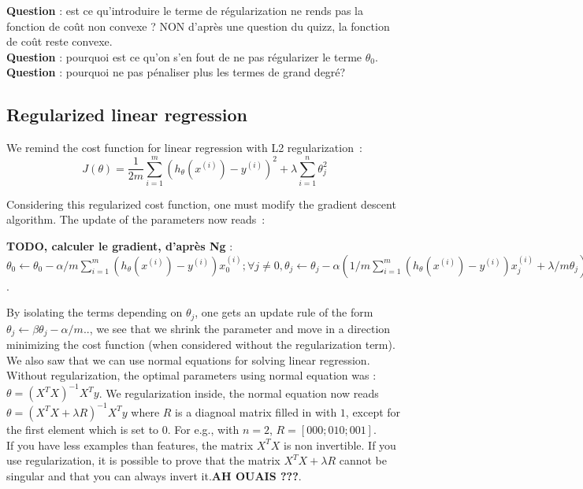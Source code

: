 \documentclass[10pt,a4paper]{article}
\begin{document}
\textbf{Question} : est ce qu'introduire le terme de régularization ne
rends pas la fonction de coût non convexe ? NON d'après une question
du quizz, la fonction de coût reste convexe.\\

\textbf{Question} : pourquoi est ce qu'on s'en fout de ne pas
régularizer le terme $\theta_0$.\\

\textbf{Question} : pourquoi ne pas pénaliser plus les termes de grand degré?

\subsection{Regularized linear regression}

We remind the cost function for linear regression with L2
regularization~:
\begin{equation}
J(\theta) = \frac{1}{2m} \sum_{i=1}^m (h_\theta(x^{(i)}) -
y^{(i)})^2 + \lambda \sum_{i=1}^{n} \theta_j^2
\end{equation}

Considering this regularized cost function, one must modify the
gradient descent algorithm. The update of the parameters now reads~:

\textbf{TODO, calculer le gradient, d'après Ng } : $ \theta_0
\leftarrow \theta_0 - \alpha/m \sum_{i=1}^m (h_\theta(x^{(i)})
-y^{(i)}) x_0^{(i)} ; \forall j\neq 0, \theta_j
\leftarrow \theta_j - \alpha ( 1/m \sum_{i=1}^m (h_\theta(x^{(i)})
-y^{(i)}) x_j^{(i)} + \lambda/m \theta_j) = (1 - \alpha \lambda/m)
\theta_j - \alpha / m ...$.

By isolating the terms depending on $\theta_j$, one gets an update
rule of the form $ \theta_j \leftarrow \beta \theta_j - \alpha/m ..$,
we see that we shrink the parameter and move in a direction minimizing
the cost function (when considered without the regularization term).\\

We also saw that we can use normal equations for solving linear
regression. Without regularization, the optimal parameters using
normal equation was :$\theta = (X^T X)^{-1} X^T y$. We regularization
inside, the normal equation now reads $\theta = (X^T X + \lambda
R)^{-1} X^T y$ where $R$ is a diagnoal matrix filled in with $1$,
except for the first element which is set to $0$. For e.g., with
$n=2$, $R = [0 0 0; 0 1 0; 0 0 1]$.\\

If you have less examples than features, the matrix $X^TX$ is non
invertible. If you use regularization, it is possible to prove that
the matrix $X^T X + \lambda R$ cannot be singular and that you can
always invert it.\textbf{AH OUAIS ???}.\\
\end{document}
